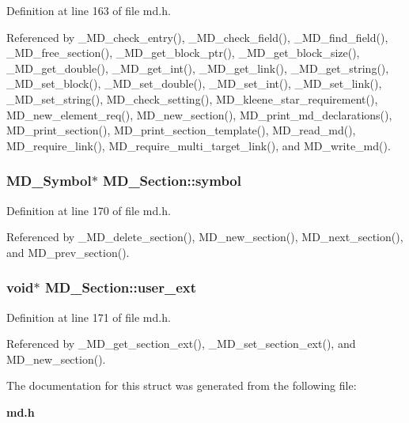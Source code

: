 Definition at line 163 of file md.h.

Referenced by \_\-MD\_\-check\_\-entry(), \_\-MD\_\-check\_\-field(), \_\-MD\_\-find\_\-field(), \_\-MD\_\-free\_\-section(), \_\-MD\_\-get\_\-block\_\-ptr(), \_\-MD\_\-get\_\-block\_\-size(), \_\-MD\_\-get\_\-double(), \_\-MD\_\-get\_\-int(), \_\-MD\_\-get\_\-link(), \_\-MD\_\-get\_\-string(), \_\-MD\_\-set\_\-block(), \_\-MD\_\-set\_\-double(), \_\-MD\_\-set\_\-int(), \_\-MD\_\-set\_\-link(), \_\-MD\_\-set\_\-string(), MD\_\-check\_\-setting(), MD\_\-kleene\_\-star\_\-requirement(), MD\_\-new\_\-element\_\-req(), MD\_\-new\_\-section(), MD\_\-print\_\-md\_\-declarations(), MD\_\-print\_\-section(), MD\_\-print\_\-section\_\-template(), MD\_\-read\_\-md(), MD\_\-require\_\-link(), MD\_\-require\_\-multi\_\-target\_\-link(), and MD\_\-write\_\-md().
\subsubsection{\setlength{\rightskip}{0pt plus 5cm}\bf{MD\_\-Symbol}$\ast$ \bf{MD\_\-Section::symbol}}\label{structMD__Section_e2796ca05f59124064b04422fb2b34a3}




Definition at line 170 of file md.h.

Referenced by \_\-MD\_\-delete\_\-section(), MD\_\-new\_\-section(), MD\_\-next\_\-section(), and MD\_\-prev\_\-section().
\subsubsection{\setlength{\rightskip}{0pt plus 5cm}void$\ast$ \bf{MD\_\-Section::user\_\-ext}}\label{structMD__Section_13a169e23b30fb1cfa88cbdf48e8ae1d}




Definition at line 171 of file md.h.

Referenced by \_\-MD\_\-get\_\-section\_\-ext(), \_\-MD\_\-set\_\-section\_\-ext(), and MD\_\-new\_\-section().

The documentation for this struct was generated from the following file:\begin{CompactItemize}
\item 
\bf{md.h}\end{CompactItemize}
